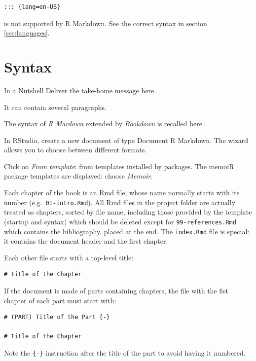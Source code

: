 \documentclass[
  12pt,
  american,
  a4paper,
  extrafontsizes,onecolumn,openright
  ]{memoir}
\newenvironment{Summary}
  {\begin{bclogo}[logo=\bctrombone, noborder=true, couleur=lightgray!50]{In a Nutshell}\parindent0pt}
  {\end{bclogo}}
\begin{document}
\begin{verbatim}
::: {lang=en-US}
\end{verbatim}

is not supported by R Markdown.
See the correct syntax in section \ref{sec:languages}.

\chapter{Syntax}\label{syntax}

\begin{Summary}
Deliver the take-home message here.

It can contain several paragraphs.

\end{Summary}

The syntax of \emph{R Mardown} extended by \emph{Bookdown} is recalled here.

In RStudio, create a new document of type Document R Markdown.
The wizard allows you to choose between different formats.

Click on \emph{From template}: from templates installed by packages.
The memoiR package templates are displayed: choose \emph{Memoir}.

Each chapter of the book is an Rmd file, whose name normally starts with its number (e.g.~\texttt{01-intro.Rmd}).
All Rmd files in the project folder are actually treated as chapters, sorted by file name, including those provided by the template (startup and syntax) which should be deleted except for \texttt{99-references.Rmd} which contains the bibliography, placed at the end.
The \texttt{index.Rmd} file is special: it contains the document header and the first chapter.

Each other file starts with a top-level title:

\begin{verbatim}
# Title of the Chapter
\end{verbatim}

If the document is made of parts containing chapters, the file with the fist chapter of each part must start with:

\begin{verbatim}
# (PART) Title of the Part {-}
  
# Title of the Chapter
\end{verbatim}

Note the \texttt{\{-\}} instruction after the title of the part to avoid having it numbered.
\end{document}
